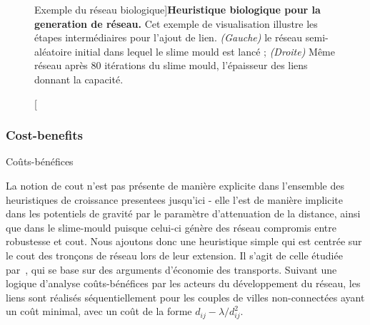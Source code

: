 \begin{figure}
\hspace{0.2cm}
\caption[Biological Network Example][Exemple du réseau biologique]{}{\textbf{Heuristique biologique pour la generation de réseau.} Cet exemple de visualisation illustre les étapes intermédiaires pour l'ajout de lien. \textit{(Gauche)} le réseau semi-aléatoire initial dans lequel le slime mould est lancé ; \textit{(Droite)} Même réseau après 80 itérations du slime mould, l'épaisseur des liens donnant la capacité.\label{fig:networkgrowth:bioexample}}
\end{figure}


\subsubsection{Cost-benefits}{Coûts-bénéfices}

La notion de cout n'est pas présente de manière explicite dans l'ensemble des heuristiques de croissance presentees jusqu'ici - elle l'est de manière implicite dans les potentiels de gravité par le paramètre d'attenuation de la distance, ainsi que dans le slime-mould puisque celui-ci génère des réseau compromis entre robustesse et cout. Nous ajoutons donc une heuristique simple qui est centrée sur le cout des tronçons de réseau lors de leur extension. Il s'agit de celle étudiée par~\cite{louf2013emergence}, qui se base sur des arguments d'économie des transports. Suivant une logique d'analyse coûts-bénéfices par les acteurs du développement du réseau, les liens sont réalisés séquentiellement pour les couples de villes non-connectées ayant un coût minimal, avec un coût de la forme $d_{ij} - \lambda / d_{ij}^2$.






